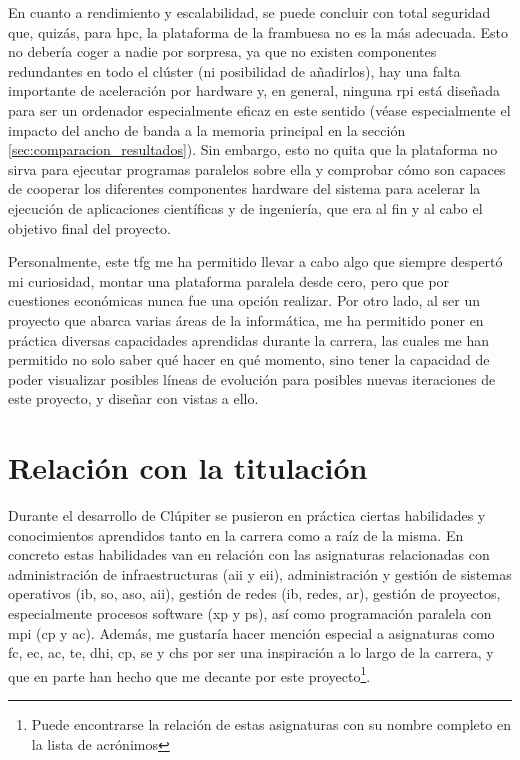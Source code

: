 En cuanto a rendimiento y escalabilidad, se puede concluir con total seguridad que, quizás, para \acrshort{hpc}, la plataforma de la frambuesa no es la más adecuada. Esto no debería coger a nadie por sorpresa, ya que no existen componentes redundantes en todo el clúster (ni posibilidad de añadirlos), hay una falta importante de aceleración por hardware y, en general, ninguna \acrlong{rpi} está diseñada para ser un ordenador especialmente eficaz en este sentido (véase especialmente el impacto del ancho de banda a la memoria principal en la sección \ref{sec:comparacion_resultados}). Sin embargo, esto no quita que la plataforma no sirva para ejecutar programas paralelos sobre ella y comprobar cómo son capaces de cooperar los diferentes componentes hardware del sistema para acelerar la ejecución de aplicaciones científicas y de ingeniería, que era al fin y al cabo el objetivo final del proyecto.

Personalmente, este \acrshort{tfg} me ha permitido llevar a cabo algo que siempre despertó mi curiosidad, montar una plataforma paralela desde cero, pero que por cuestiones económicas nunca fue una opción realizar. Por otro lado, al ser un proyecto que abarca varias áreas de la informática, me ha permitido poner en práctica diversas capacidades aprendidas durante la carrera, las cuales me han permitido no solo saber qué hacer en qué momento, sino tener la capacidad de poder visualizar posibles líneas de evolución para posibles nuevas iteraciones de este proyecto, y diseñar con vistas a ello.

\section{Relación con la titulación}
Durante el desarrollo de Clúpiter se pusieron en práctica ciertas habilidades y conocimientos aprendidos tanto en la carrera como a raíz de la misma. En concreto estas habilidades van en relación con las asignaturas relacionadas con administración de infraestructuras (\acrshort{aii} y \acrshort{eii}), administración y gestión de sistemas operativos (\acrshort{ib}, \acrshort{so}, \acrshort{aso}, \acrshort{aii}), gestión de redes (\acrshort{ib}, redes, \acrshort{ar}), gestión de proyectos, especialmente procesos software (\acrshort{xp} y \acrshort{ps}), así como programación paralela con \acrshort{mpi} (\acrshort{cp} y \acrshort{ac}). Además, me gustaría hacer mención especial a asignaturas como \acrshort{fc}, \acrshort{ec}, \acrshort{ac}, \acrshort{te}, \acrshort{dhi}, \acrshort{cp}, \acrshort{se} y \acrshort{chs} por ser una inspiración a lo largo de la carrera, y que en parte han hecho que me decante por este proyecto\footnote{Puede encontrarse la relación de estas asignaturas con su nombre completo en la lista de acrónimos}.

